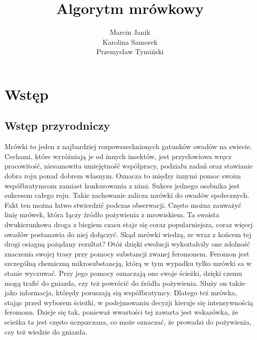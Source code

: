 \documentclass[printmode, openany, oneside, eng]{mgr}
\title{Algorytm mrówkowy}
\author{Marcin Janik\\
Karolina Samorek\\
Przemysław Tymiński}
\begin{document}

\maketitle %
\chapter{Wstęp} \label{chap:wstep}

\section{Wstęp przyrodniczy}\label{sec:przedmowa}
Mrówki  to jeden z najbardziej rozpowszechnionych gatunków owadów na swiecie. Cechami, które wyróżniają je od innych
insektów, jest przysłowiowa wręcz pracowitość, niesamowita umiejętność współpracy, podziału zadań oraz stawianie dobra roju
ponad dobrem wlasnym. Oznacza to między innymi pomoc swoim współbratymcom zamiast konkurowania z nimi. Sukces jednego
osobnika jest sukcesem całego roju. Takie zachowanie zalicza mrówki do owadów społecznych.
Fakt ten można łatwo stwierdzić podczas obserwacji. Często można zauważyć linię mrówek, która łączy źródło
pożywienia z mrowiskiem. Ta swoista dwukierunkowa droga z biegiem czasu staje się coraz popularniejsza, coraz więcej
owadów postanawia do niej dołączyć. Skąd mrówki wiedzą, ze wraz z końcem tej drogi osiagną pożądany rezultat? Otóż dzięki ewolucji wykształciły one zdolność znaczenia swojej trasy przy pomocy substancji zwanej feromonem.
\newline Feromon jest szczególną chemiczną mikrosubstancją, którą w tym wypadku tylko mrówki sa w stanie wyczuwać. Przy jego pomocy oznaczają one swoje ścieżki, dzięki czemu mogą trafić do gniazda, czy też powrócić do źródła pożywienia. Służy on także jako informacja, którędy poruszają sią współbratymcy. Dlatego też mrówka, stając przed wyborem ścieżki, w podejmowaniu decyzji kieruje się intensywnością feromonu. Dzieje się tak, ponieważ wwartości tej zawarta jest wskazówka, że scieżka ta jest często uczęszczana, co może oznaczać, że prowadzi do pożywienia, czy też wiedzie do gniazda.
\end{document}
